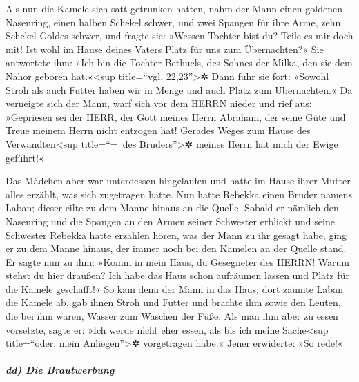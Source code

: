  Als nun die Kamele sich satt getrunken hatten, nahm der
Mann einen goldenen Nasenring, einen halben Schekel schwer, und zwei
Spangen für ihre Arme, zehn Schekel Goldes schwer,  und
fragte sie: »Wessen Tochter bist du? Teile es mir doch mit! Ist wohl im
Hause deines Vaters Platz für uns zum Übernachten?«  Sie
antwortete ihm: »Ich bin die Tochter Bethuels, des Sohnes der Milka, den
sie dem Nahor geboren hat.«\textless sup title=``vgl.
22,23''\textgreater✲  Dann fuhr sie fort: »Sowohl Stroh
als auch Futter haben wir in Menge und auch Platz zum Übernachten.«
 Da verneigte sich der Mann, warf sich vor dem HERRN
nieder  und rief aus: »Gepriesen sei der HERR, der Gott
meines Herrn Abraham, der seine Güte und Treue meinem Herrn nicht
entzogen hat! Gerades Weges zum Hause des Verwandten\textless sup
title=``=~des Bruders''\textgreater✲ meines Herrn hat mich der Ewige
geführt!«

 Das Mädchen aber war unterdessen hingelaufen und hatte
im Hause ihrer Mutter alles erzählt, was sich zugetragen hatte.
 Nun hatte Rebekka einen Bruder namens Laban; dieser
eilte zu dem Manne hinaus an die Quelle.  Sobald er
nämlich den Nasenring und die Spangen an den Armen seiner Schwester
erblickt und seine Schwester Rebekka hatte erzählen hören, was der Mann
zu ihr gesagt habe, ging er zu dem Manne hinaus, der immer noch bei den
Kamelen an der Quelle stand.  Er sagte nun zu ihm: »Komm
in mein Haus, du Gesegneter des HERRN! Warum stehst du hier draußen? Ich
habe das Haus schon aufräumen lassen und Platz für die Kamele
geschafft!«  So kam denn der Mann in das Haus; dort
zäumte Laban die Kamele ab, gab ihnen Stroh und Futter und brachte ihm
sowie den Leuten, die bei ihm waren, Wasser zum Waschen der Füße.
 Als man ihm aber zu essen vorsetzte, sagte er: »Ich
werde nicht eher essen, als bis ich meine Sache\textless sup
title=``oder: mein Anliegen''\textgreater✲ vorgetragen habe.« Jener
erwiderte: »So rede!«

\hypertarget{dd-die-brautwerbung}{%
\subparagraph{dd) Die Brautwerbung}\label{dd-die-brautwerbung}}

